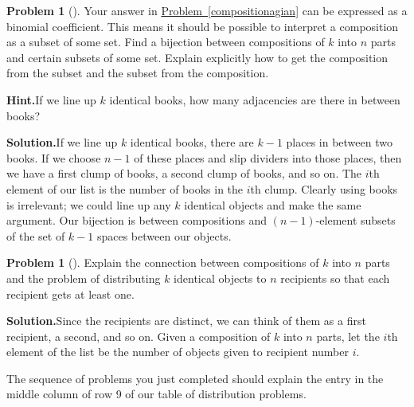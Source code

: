 \documentclass[10pt,]{book}
\theoremstyle{plain}
\theoremstyle{definition}
\newtheorem{activity}[project]{Problem}
\theoremstyle{definition}
\numberwithin{equation}{chapter}
\begin{document}
\begin{activity}[]\label{activity-131}
Your answer in \hyperref[compositionagian]{Problem~\ref{compositionagian}} can be expressed as a binomial coefficient. This means it should be possible to interpret a composition as a subset of some set. Find a bijection between compositions of \(k\) into \(n\) parts and certain subsets of some set.  Explain explicitly how to get the composition from the subset and the subset from the composition.%
\par\medskip\noindent%
\textbf{Hint.}\quad If we line up \(k\) identical books, how many adjacencies are there in between books?%
\par\medskip\noindent%
\textbf{Solution.}\quad If we line up \(k\) identical books, there are \(k-1\) places in between two books. If we choose \(n-1\) of these places and slip dividers into those places, then we have a first clump of books, a second clump of books, and so on. The \(i\)th element of our list is the number of books in the \(i\)th clump. Clearly using books is irrelevant; we could line up any \(k\) identical objects and make the same argument. Our bijection is between compositions and \((n-1)\)-element subsets of the set of \(k-1\) spaces between our objects.%
\end{activity}
\begin{activity}[]\label{activity-132}
Explain the connection between compositions of \(k\) into \(n\) parts and the problem of distributing \(k\) identical objects to \(n\) recipients so that each recipient gets at least one.%
\par\medskip\noindent%
\textbf{Solution.}\quad Since the recipients are distinct, we can think of them as a first recipient, a second, and so on. Given a composition of \(k\) into \(n\) parts, let the \(i\)th element of the list be the number of objects given to recipient number \(i\).%
\end{activity}
The sequence of problems you just completed should explain the entry in the middle column of row 9 of our table of distribution problems.%
\typeout{************************************************}
\typeout{************************************************}
\end{document}
